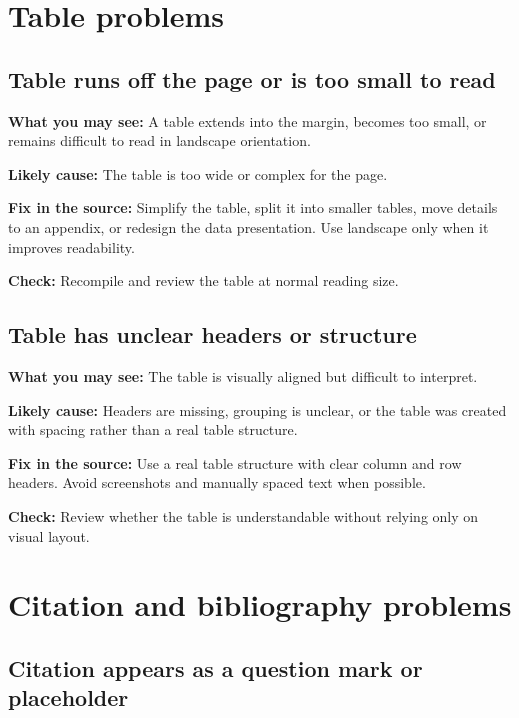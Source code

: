 \section{Table problems}
\label{sec:table-problems}

\subsection{Table runs off the page or is too small to read}
\label{subsec:table-runs-off-page}

\textbf{What you may see:} A table extends into the margin, becomes too small, or remains difficult to read in landscape orientation.

\textbf{Likely cause:} The table is too wide or complex for the page.

\textbf{Fix in the source:} Simplify the table, split it into smaller tables, move details to an appendix, or redesign the data presentation. Use landscape only when it improves readability.

\textbf{Check:} Recompile and review the table at normal reading size.

\subsection{Table has unclear headers or structure}
\label{subsec:table-unclear-headers}

\textbf{What you may see:} The table is visually aligned but difficult to interpret.

\textbf{Likely cause:} Headers are missing, grouping is unclear, or the table was created with spacing rather than a real table structure.

\textbf{Fix in the source:} Use a real table structure with clear column and row headers. Avoid screenshots and manually spaced text when possible.

\textbf{Check:} Review whether the table is understandable without relying only on visual layout.

\section{Citation and bibliography problems}
\label{sec:citation-bibliography-problems}

\subsection{Citation appears as a question mark or placeholder}
\label{subsec:citation-question-mark}

